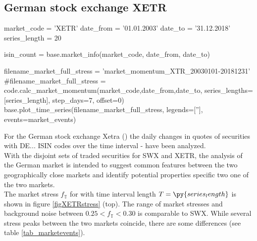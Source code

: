 \documentclass[11pt,twoside,a4paper]{article}
\begin{document}
\subsection{German stock exchange XETR}
\begin{pycode}
market_code = 'XETR'
date_from = '01.01.2003'
date_to = '31.12.2018'
series_length = 20

isin_count = base.market_info(market_code, date_from, date_to)

filename_market_full_stress = 'market_momentum_XTR_20030101-20181231'
#filename_market_full_stress = code.calc_market_momentum(market_code,date_from,date_to, series_lengths=[series_length], step_days=7, offset=0)
base.plot_time_series(filename_market_full_stress, legends=[''], events=market_events)
\end{pycode}
For the German stock exchange Xetra () the daily changes in quotes of  securities with DE... ISIN codes over the time interval  -  have been analyzed.\\
With the disjoint sets of traded securities for SWX and XETR, the analysis of the German market is intended to suggest common features between the two geographically close markets and identify potential properties specific two one of the two markets.\\

The market stress $f_\mathbb{T}$ for  with time interval length $T=\py{series_length}$ is shown in figure \ref{figXETRstress} (top). The range of market stresses and background noise between $0.25 < f_\mathbb{T} < 0.30$ is comparable to SWX. While several stress peaks between the two markets coincide, there are some differences (see table \ref{tab_marketevents}).\\
\end{document}
